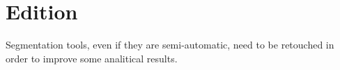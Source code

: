 \section{Edition}

Segmentation tools, even if they are semi-automatic, need to be retouched in order to improve some analitical results.

